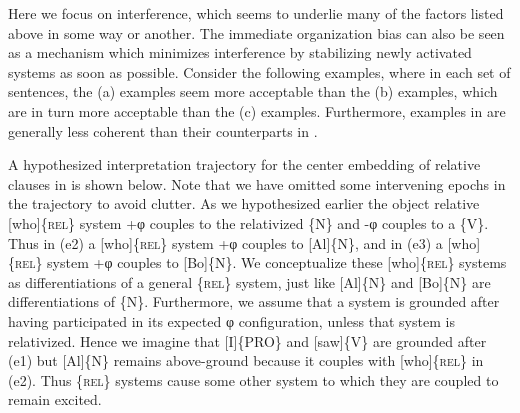   Here we focus on interference, which seems to underlie many of the factors listed above in some way or another. The immediate organization bias can also be seen as a mechanism which minimizes interference by stabilizing newly activated systems as soon as possible. Consider the following examples, where in each set of sentences, the (a) examples seem more acceptable than the (b) examples, which are in turn more acceptable than the (c) examples. Furthermore, examples in  are generally less coherent than their counterparts in .  




  

  A hypothesized interpretation trajectory for the center embedding of relative clauses in  is shown below. Note that we have omitted some intervening epochs in the trajectory to avoid clutter. As we hypothesized earlier the object relative [who]\{\textsc{rel}\} system +φ couples to the relativized \{N\} and -φ couples to a \{V\}. Thus in (e2) a [who]\{\textsc{rel}\} system +φ couples to [Al]\{N\}, and in (e3) a [who]\{\textsc{rel}\} system +φ couples to [Bo]\{N\}. We conceptualize these [who]\{\textsc{rel}\} systems as differentiations of a general \{\textsc{rel}\} system, just like [Al]\{N\} and [Bo]\{N\} are differentiations of \{N\}. Furthermore, we assume that a system is grounded after having participated in its expected φ configuration, unless that system is relativized. Hence we imagine that [I]\{\textsc{PRO}\} and [saw]\{V\} are grounded after (e1) but [Al]\{N\} remains above-ground because it couples with [who]\{\textsc{rel}\} in (e2). Thus \{\textsc{rel}\} systems cause some other system to which they are coupled to remain excited.

